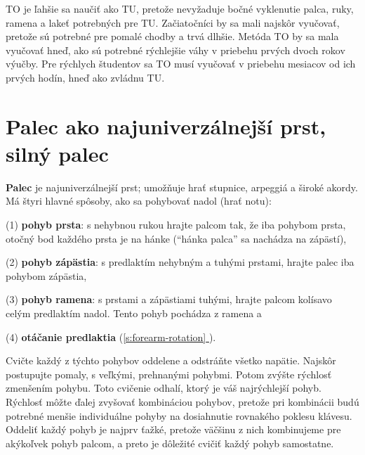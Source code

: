\documentclass[11pt,a4paper]{book}
\newcommand*{\fullref}[1]{\hyperref[{#1}]{\ref*{#1} \nameref*{#1}}} %
\begin{document}
TO je ľahšie sa naučiť ako TU, pretože nevyžaduje bočné vyklenutie palca, ruky, ramena a lakeť potrebných pre TU. Začiatočníci by sa mali najskôr vyučovať, pretože sú potrebné pre pomalé chodby a trvá dlhšie. Metóda TO by sa mala vyučovať hneď, ako sú potrebné rýchlejšie váhy v priebehu prvých dvoch rokov výučby. Pre rýchlych študentov sa TO musí vyučovať v priebehu mesiacov od ich prvých hodín, hneď ako zvládnu TU.


\section{Palec ako najuniverzálnejší prst, silný palec}\label{s:thumb}
\textbf{Palec} je najuniverzálnejší prst; umožňuje hrať stupnice, arpeggiá a široké akordy. Má štyri hlavné spôsoby, ako sa pohybovať nadol (hrať notu):

(1) \textbf{pohyb prsta}: s nehybnou rukou hrajte palcom tak, že iba pohybom prsta, otočný bod každého prsta je na hánke (“hánka palca” sa nachádza na zápästí),

(2) \textbf{pohyb zápästia}: s predlaktím nehybným a tuhými prstami, hrajte palec iba pohybom zápästia,

(3) \textbf{pohyb ramena}: s prstami a zápästiami tuhými, hrajte palcom kolísavo  celým predlaktím nadol. Tento pohyb pochádza z ramena a

(4) \textbf{otáčanie predlaktia} (\fullref{s:forearm-rotation}).

Cvičte každý z týchto pohybov oddelene a odstráňte všetko napätie. Najskôr postupujte pomaly, s veľkými, prehnanými pohybmi. Potom zvýšte rýchlosť zmenšením pohybu. Toto cvičenie odhalí, ktorý je váš najrýchlejší pohyb. Rýchlosť môžte ďalej zvyšovať kombináciou pohybov, pretože pri kombinácii budú potrebné menšie individuálne pohyby na dosiahnutie rovnakého poklesu klávesu. Oddeliť každý pohyb je najprv ťažké, pretože väčšinu z nich kombinujeme pre akýkoľvek pohyb palcom, a preto je dôležité cvičiť každý pohyb samostatne.
\end{document}
